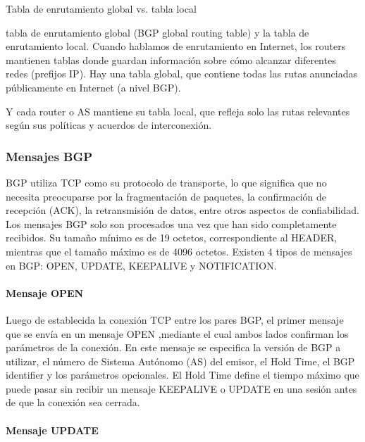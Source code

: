 Tabla de enrutamiento global vs. tabla local


tabla de enrutamiento global (BGP global routing table) y la tabla de enrutamiento local.
Cuando hablamos de enrutamiento en Internet, los routers mantienen tablas donde guardan información sobre cómo alcanzar diferentes redes (prefijos IP).
Hay una tabla global, que contiene todas las rutas anunciadas públicamente en Internet (a nivel BGP).


Y cada router o AS mantiene su tabla local, que refleja solo las rutas relevantes según sus políticas y acuerdos de interconexión.


\subsubsection{Mensajes BGP}  \label{sec:anexo_mensajes_bgp}

BGP utiliza TCP \cite{RFC793-TCP} como su protocolo de transporte, lo que significa que no necesita preocuparse por la fragmentación de paquetes, la confirmación de recepción (ACK), la retransmisión de datos, entre otros aspectos de confiabilidad.\\

Los mensajes BGP solo son procesados una vez que han sido completamente recibidos. Su tamaño mínimo es de 19 octetos, correspondiente al HEADER, mientras que el tamaño máximo es de 4096 octetos. Existen 4 tipos de mensajes en BGP: OPEN, UPDATE, KEEPALIVE y NOTIFICATION.\\


\paragraph{Mensaje OPEN}


Luego de establecida la conexión TCP entre los pares BGP, el primer mensaje que se envía en un mensaje OPEN ,mediante el cual ambos lados confirman los parámetros de la conexión.
En este mensaje se especifica la versión de BGP a utilizar, el número de Sistema Autónomo (AS) del emisor, el Hold Time, el BGP identifier y los parámetros opcionales.
El Hold Time define el tiempo máximo que puede pasar sin recibir un mensaje KEEPALIVE o UPDATE en una sesión antes de que la conexión sea cerrada.\\



\paragraph{Mensaje UPDATE}

